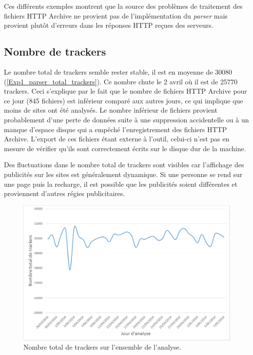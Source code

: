 Ces différents exemples montrent que la source des problèmes de traitement des fichiers HTTP Archive ne provient pas de l'implémentation du \textit{parser} mais provient plutôt d'erreurs dans les réponses HTTP reçues des serveurs.

\subsection{Nombre de trackers}
Le nombre total de trackers semble rester stable, il est en moyenne de 30080 (\autoref{Exp1_parser_total_trackers}). Ce nombre chute le 2 avril où il est de 25770 trackers. Ceci s'explique par le fait que le nombre de fichiers HTTP Archive pour ce jour (845 fichiers) est inférieur comparé aux autres jours, ce qui implique que moins de sites ont été analysés. Le nombre inférieur de fichiers provient probablement d'une perte de données suite à une suppression accidentelle ou à un manque d'espace disque qui a empêché l'enregistrement des fichiers HTTP Archive. L'export de ces fichiers étant externe à l'outil, celui-ci n'est pas en mesure de vérifier qu'ils sont correctement écrits sur le disque dur de la machine.

Des fluctuations dans le nombre total de trackers sont visibles car l'affichage des publicités sur les sites est généralement dynamique. Si une personne se rend sur une page puis la recharge, il est possible que les publicités soient différentes et proviennent d'autres régies publicitaires.

\begin{figure}[h]
	\centering
	\includegraphics[scale=.56]{Exp_40jours/Exp1_parser_total_trackers.png}
	\caption{\label{Exp1_parser_total_trackers}Nombre total de trackers sur l'ensemble de l'analyse.}
\end{figure}

